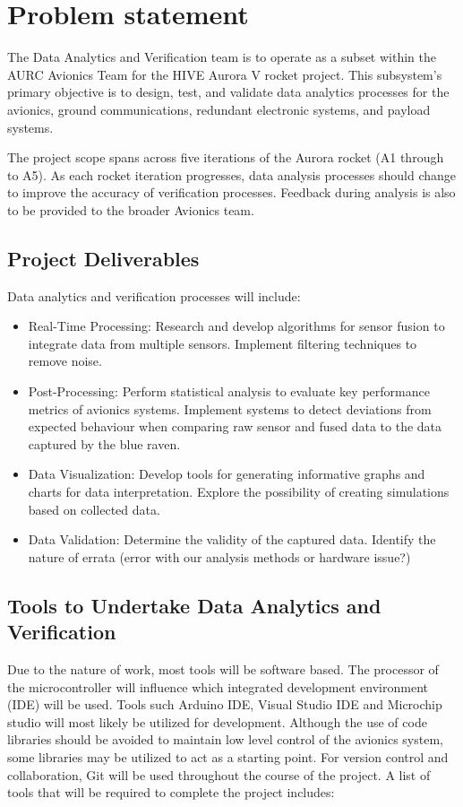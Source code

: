 \begin{abstract}
   
\end{abstract}

\section{Problem statement}
The Data Analytics and Verification team is to operate as a subset within the AURC Avionics Team for the HIVE Aurora V rocket project. This subsystem's primary objective is to design, test, and validate data analytics processes for the avionics, ground communications, redundant electronic systems, and payload systems.  

The project scope spans across five iterations of the Aurora rocket (A1 through to A5). As each rocket iteration progresses, data analysis processes should change to improve the accuracy of verification processes. Feedback during analysis is also to be provided to the broader Avionics team.     

\subsection{Project Deliverables}
Data analytics and verification processes will include:  
\begin{itemize}
  \item Real-Time Processing: Research and develop algorithms for sensor fusion to integrate data from multiple sensors. Implement filtering techniques to remove noise. 
  \item Post-Processing: Perform statistical analysis to evaluate key performance metrics of avionics systems. Implement systems to detect deviations from expected behaviour when comparing raw sensor and fused data to the data captured by the blue raven.     
  \item Data Visualization: Develop tools for generating informative graphs and charts for data interpretation. Explore the possibility of creating simulations based on collected data. 
  \item Data Validation: Determine the validity of the captured data. Identify the nature of errata (error with our analysis methods or hardware issue?) 
\end{itemize}


\subsection{Tools to Undertake Data Analytics and Verification}
Due to the nature of work, most tools will be software based. The processor of the microcontroller will influence which integrated development environment (IDE) will be used. Tools such Arduino IDE, Visual Studio IDE and Microchip studio will most likely be utilized for development. Although the use of code libraries should be avoided to maintain low level control of the avionics system, some libraries may be utilized to act as a starting point. For version control and collaboration, Git will be used throughout the course of the project. A list of tools that will be required to complete the project includes:


